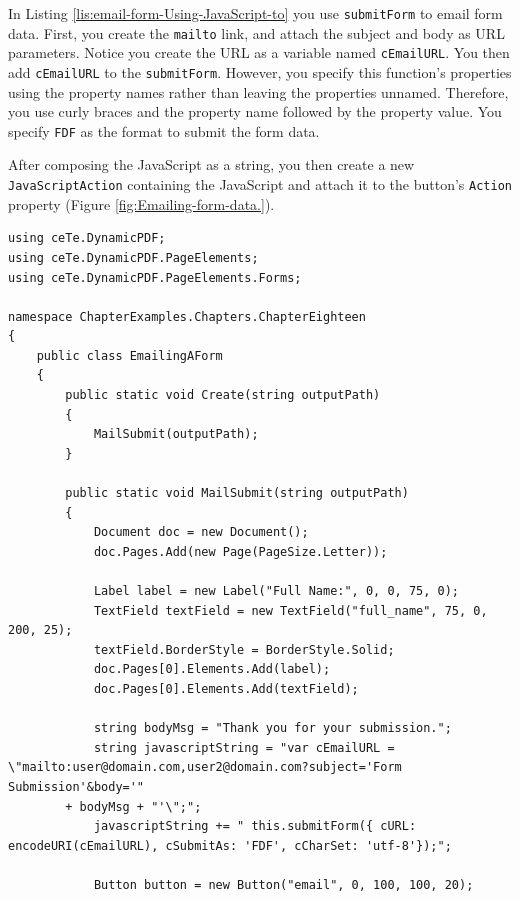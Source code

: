 \documentclass[american,letterpaper]{tufte-book}
\numberwithin{equation}{section}
\numberwithin{figure}{section}
\begin{document}
{{In Listing \ref{lis:email-form-Using-JavaScript-to} you use \texttt{submitForm}
to email form data. First, you create the \texttt{mailto} link, and
attach the subject and body as URL parameters. Notice you create the
URL as a variable named \texttt{cEmailURL}. You then add \texttt{cEmailURL}
to the \texttt{submitForm}. However, you specify this function's properties
using the property names rather than leaving the properties unnamed.
Therefore, you use curly braces and the property name followed by the
property value. You specify \texttt{FDF} as the format to submit the
form data. 

After composing the JavaScript as a string, you then create a new \texttt{JavaScriptAction}
containing the JavaScript and attach it to the button's \texttt{Action}
property (Figure \ref{fig:Emailing-form-data.}).

\bgroup{}
\begin{lstlisting}[caption={Using JavaScript to email a form.},label={lis:email-form-Using-JavaScript-to},basicstyle={\small\ttfamily},breaklines=true]
using ceTe.DynamicPDF;
using ceTe.DynamicPDF.PageElements;
using ceTe.DynamicPDF.PageElements.Forms;

namespace ChapterExamples.Chapters.ChapterEighteen
{
    public class EmailingAForm
    {
        public static void Create(string outputPath)
        {
            MailSubmit(outputPath);  
        }

        public static void MailSubmit(string outputPath)
        {
            Document doc = new Document();
            doc.Pages.Add(new Page(PageSize.Letter));

            Label label = new Label("Full Name:", 0, 0, 75, 0);
            TextField textField = new TextField("full_name", 75, 0, 200, 25);
            textField.BorderStyle = BorderStyle.Solid;
            doc.Pages[0].Elements.Add(label);
            doc.Pages[0].Elements.Add(textField);

            string bodyMsg = "Thank you for your submission.";
            string javascriptString = "var cEmailURL = \"mailto:user@domain.com,user2@domain.com?subject='Form Submission'&body='" 
        + bodyMsg + "'\";";
            javascriptString += " this.submitForm({ cURL: encodeURI(cEmailURL), cSubmitAs: 'FDF', cCharSet: 'utf-8'});";

            Button button = new Button("email", 0, 100, 100, 20);


\end{lstlisting}}}
\end{document}
